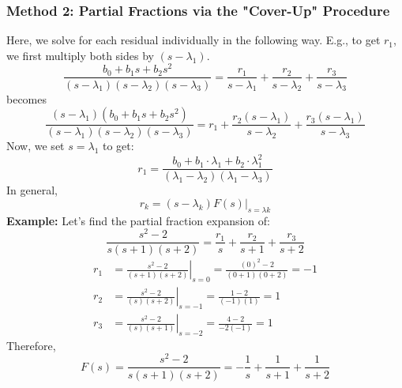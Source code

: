 \documentclass[10pt]{article}
\begin{document}
\subsubsection*{Method 2: Partial Fractions via the "Cover-Up" Procedure}
Here, we solve for each residual individually in the following way.  E.g., to get $r_1$, we first multiply both sides by $(s - \lambda_1)$.
\[\frac{b_0 + b_1 s + b_2 s^2}{(s - \lambda_1)(s - \lambda_2)(s - \lambda_3)} = \frac{r_1}{s - \lambda_1} + \frac{r_2}{s - \lambda_2} + \frac{r_3}{s - \lambda_3}\]
becomes
\[\frac{(s - \lambda_1)(b_0 + b_1 s + b_2 s^2)}{(s - \lambda_1)(s - \lambda_2)(s - \lambda_3)} = r_1 + \frac{r_2(s - \lambda_1)}{s - \lambda_2} + \frac{r_3(s - \lambda_1)}{s - \lambda_3}\]
Now, we set $s = \lambda_1$ to get:
\[r_1 = \frac{b_0 + b_1 \cdot \lambda_1 + b_2 \cdot \lambda_1^2}{(\lambda_1 - \lambda_2)(\lambda_1 - \lambda_3)}\]
In general,
\[r_k = (s - \lambda_k)F(s) \big|_{s = \lambda k}\]
\textbf{Example:}
Let's find the partial fraction expansion of:
\[\frac{s^2 - 2}{s(s + 1)(s + 2)} = \frac{r_1}{s} + \frac{r_2}{s + 1} + \frac{r_3}{s + 2}\]
\begin{align*}
    r_1 &= \left.\frac{s^2 - 2}{(s + 1)(s + 2)}\right|_{s = 0} = \frac{(0)^2 - 2}{(0 + 1)(0 + 2)} = -1\\
    r_2 &= \left.\frac{s^2 - 2}{(s)(s + 2)}\right|_{s = -1} = \frac{1 - 2}{(-1)(1)} = 1\\
    r_3 &= \left.\frac{s^2 - 2}{(s)(s + 1)}\right|_{s=-2} = \frac{4 - 2}{-2(-1)} = 1
\end{align*}
Therefore,
\[F(s) = \frac{s^2 - 2}{s(s + 1)(s + 2)} = -\frac{1}{s} + \frac{1}{s + 1} + \frac{1}{s + 2}\]
\end{document}
